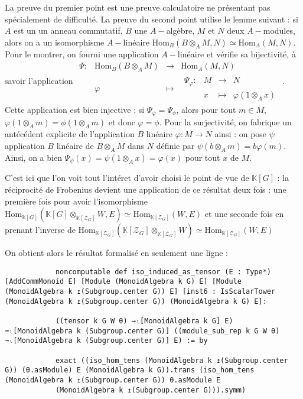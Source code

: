 \documentclass[10pt]{article}
\newcommand{\fonction}[5]{\begin{array}{l|rcl}
		#1: & #2 & \longrightarrow & #3 \\
		& #4 & \longmapsto & #5 \end{array}}
\theoremstyle{definition}
\begin{document}
La preuve du premier point est une preuve calculatoire ne présentant pas spécialement de difficulté.
La preuve du second point utilise le lemme suivant : si $A$ est un un anneau commutatif, $B$ une $A-$algèbre, $M$ et $N$ deux $A-$modules, alors on a un isomorphisme $A-$linéaire $\text{Hom}_B(B\otimes_AM,N)\simeq \text{Hom}_A(M,N)$. Pour le montrer, on fourni une application $A-$linéaire et vérifie sa bijectivité, à savoir l'application $\fonction{\Psi}{\text{Hom}_B(B\otimes_AM)}{\text{Hom}_A(M,N)}{\varphi}{\fonction{\Psi_\varphi}{M}{N}{x}{\varphi(1\otimes_A x)}}$. Cette application est bien injective : si $\Psi_\varphi=\Psi_\phi$, alors pour tout $m\in M$, $\varphi(1\otimes_A m)=\phi(1\otimes_Am)$ et donc $\varphi=\phi$. Pour la surjectivité, on fabrique un antécédent explicite de l'application $B$ linéaire $\varphi:M\rightarrow N$ ainsi : on pose $\psi$ application $B$ linéaire de $B\otimes_A M$ dans $N$ définie par $\psi(b\otimes_Am)=b\varphi(m)$. Ainsi, on a bien $\Psi_\psi(x)=\psi(1\otimes_Ax)=\varphi(x)$ pour tout $x$ de $M$.
\newline

C'est ici que l'on voit tout l'intéret d'avoir choisi le point de vue de $\mathbb{K}[G]$ : la réciprocité de Frobenius devient une application de ce résultat deux fois : une première fois pour avoir l'isomorphisme $\text{Hom}_{\mathbb{K}[G]}(\mathbb{K}[G]\otimes_{\mathbb{K}[\mathcal{Z}_G]}W,E)\simeq\text{Hom}_{\mathbb{K}[\mathcal{Z}_G]}(W,E)$ et une seconde fois en prenant l'inverse de $\text{Hom}_{\mathbb{K}[\mathcal{Z}_G]}(\mathbb{K}[\mathcal{Z}_G]\otimes_{\mathbb{K}[\mathcal{Z}_G]} W)\simeq \text{Hom}_{\mathbb{K}[\mathcal{Z}_G]}(W,E)$
\newline

On obtient alors le résultat formalisé en seulement une ligne : 
\begin{center}
	\begin{tcolorbox}[title = $L\exists\forall N$,width=12cm,text width=12cm,colback=lightgray!30,
		colframe=gray,sharp corners,
		rounded corners=uphill ]
		\begin{lstlisting}
			noncomputable def iso_induced_as_tensor (E : Type*) [AddCommMonoid E] [Module (MonoidAlgebra k G) E] [Module (MonoidAlgebra k ↥(Subgroup.center G)) E] [inst6 : IsScalarTower (MonoidAlgebra k ↥(Subgroup.center G)) (MonoidAlgebra k G) E]:
			
			((tensor k G W θ) →ₗ[MonoidAlgebra k G] E) ≃ₗ[MonoidAlgebra k (Subgroup.center G)] ((module_sub_rep k G W θ) →ₗ[MonoidAlgebra k (Subgroup.center G)] E) := by
			
			exact ((iso_hom_tens (MonoidAlgebra k ↥(Subgroup.center G)) (θ.asModule) E (MonoidAlgebra k G)).trans (iso_hom_tens (MonoidAlgebra k ↥(Subgroup.center G)) θ.asModule E
			(MonoidAlgebra k ↥(Subgroup.center G))).symm)
			
		\end{lstlisting}
	\end{tcolorbox}
\end{center}
\end{document}

